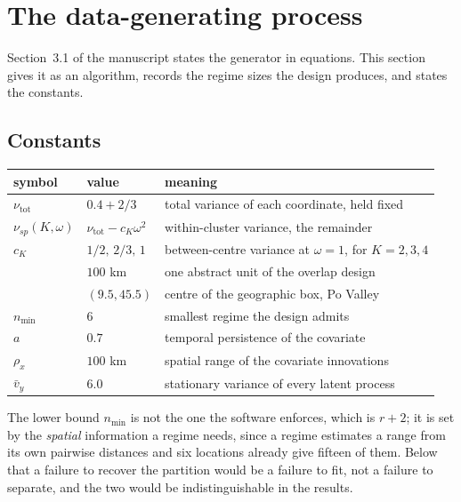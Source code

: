 \section{The data-generating process}\label{supp:dgp}\label{sm:designs}

Section~3.1 of the manuscript states the generator in equations. This section gives it as an algorithm, records the regime sizes the design produces, and states the constants.

\subsection{Constants}

\begin{center}
\begin{tabular}{lll}
\toprule
symbol & value & meaning \\
\midrule
$\nu_{\mathrm{tot}}$ & $0.4 + 2/3$ & total variance of each coordinate, held fixed \\
$\nu_{sp}(K,\omega)$ & $\nu_{\mathrm{tot}} - c_K \omega^2$ & within-cluster variance, the remainder \\
$c_K$        & $1/2,\,2/3,\,1$ & between-centre variance at $\omega=1$, for $K = 2, 3, 4$ \\
             & $100$ km     & one abstract unit of the overlap design \\
             & $(9.5, 45.5)$ & centre of the geographic box, Po Valley \\
$n_{\min}$   & $6$          & smallest regime the design admits \\
$a$          & $0.7$        & temporal persistence of the covariate \\
$\rho_x$     & $100$ km     & spatial range of the covariate innovations \\
$\bar v_y$   & $6.0$        & stationary variance of every latent process \\
\bottomrule
\end{tabular}
\end{center}

The lower bound $n_{\min}$ is not the one the software enforces, which is $r+2$; it is set by the \emph{spatial} information a regime needs, since a regime estimates a range from its own pairwise distances and six locations already give fifteen of them. Below that a failure to recover the partition would be a failure to fit, not a failure to separate, and the two would be indistinguishable in the results.

